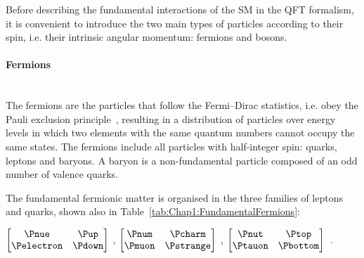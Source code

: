 

Before describing the fundamental interactions of the SM in the QFT formalism, it is convenient to introduce 
the two main types of particles according to their spin, i.e. their intrinsic angular momentum: fermions and bosons.

\paragraph{Fermions}\mbox{}\\
The fermions are the particles that follow the Fermi--Dirac statistics, i.e. obey the Pauli exclusion principle~\cite{10230794692Dirac}, resulting 
in a distribution of particles over energy levels in which two elements with the same quantum numbers cannot occupy the same states.
The fermions include all particles with half-integer spin: quarks, leptons and baryons.
A baryon is a non-fundamental particle composed of an odd number of valence quarks. 



The fundamental fermionic matter is organised in the three families of leptons 
and quarks, shown also in Table~\ref{tab:Chap1:FundamentalFermions}:

\begin{center}
$\begin{bmatrix}
\Pnue & \Pup \\
\Pelectron & \Pdown 
\end{bmatrix}$
,
$\begin{bmatrix}
\Pnum & \Pcharm \\
\Pmuon & \Pstrange 
\end{bmatrix}$
,
$\begin{bmatrix}
\Pnut & \Ptop \\
\Ptauon & \Pbottom 
\end{bmatrix}$\, .
\end{center}

